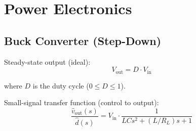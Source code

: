 \section{Power Electronics}
\label{sec:power_electronics}

\subsection{Buck Converter (Step-Down)}



Steady-state output (ideal):
\begin{equation}
V_{\text{out}} = D \cdot V_{\text{in}}
\end{equation}

where $D$ is the duty cycle ($0 \leq D \leq 1$).

Small-signal transfer function (control to output):
\begin{equation}
\frac{\hat{v}_{\text{out}}(s)}{\hat{d}(s)} = V_{\text{in}} \cdot \frac{1}{LCs^2 + (L/R_L)s + 1}
\end{equation}

